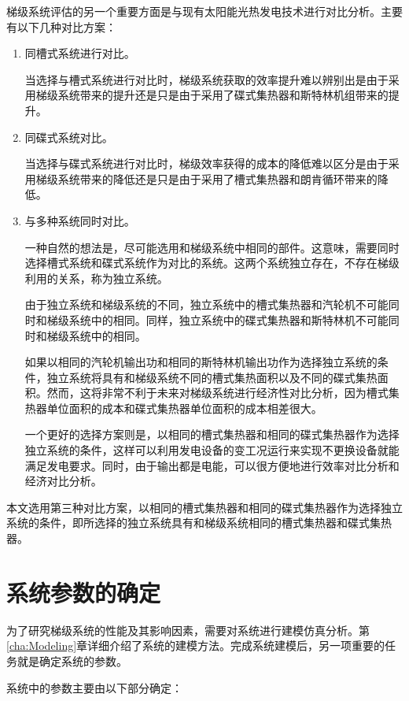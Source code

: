 梯级系统评估的另一个重要方面是与现有太阳能光热发电技术进行对比分析。主要有以下几种对比方案：

\begin{enumerate}[label=(\arabic*)]
	\item 同槽式系统进行对比。 

	\setlength\parindent{2em}当选择与槽式系统进行对比时，梯级系统获取的效率提升难以辨别出是由于采用梯级系统带来的提升还是只是由于采用了碟式集热器和斯特林机组带来的提升。
	\item 同碟式系统对比。
	
	当选择与碟式系统进行对比时，梯级效率获得的成本的降低难以区分是由于采用梯级系统带来的降低还是只是由于采用了槽式集热器和朗肯循环带来的降低。
	\item 与多种系统同时对比。
	
	一种自然的想法是，尽可能选用和梯级系统中相同的部件。这意味，需要同时选择槽式系统和碟式系统作为对比的系统。这两个系统独立存在，不存在梯级利用的关系，称为独立系统。
	
	由于独立系统和梯级系统的不同，独立系统中的槽式集热器和汽轮机不可能同时和梯级系统中的相同。同样，独立系统中的碟式集热器和斯特林机不可能同时和梯级系统中的相同。
	
	如果以相同的汽轮机输出功和相同的斯特林机输出功作为选择独立系统的条件，独立系统将具有和梯级系统不同的槽式集热面积以及不同的碟式集热面积。然而，这将非常不利于未来对梯级系统进行经济性对比分析，因为槽式集热器单位面积的成本和碟式集热器单位面积的成本相差很大。
	
	一个更好的选择方案则是，以相同的槽式集热器和相同的碟式集热器作为选择独立系统的条件，这样可以利用发电设备的变工况运行来实现不更换设备就能满足发电要求。同时，由于输出都是电能，可以很方便地进行效率对比分析和经济对比分析。
	
\end{enumerate}

本文选用第三种对比方案，以相同的槽式集热器和相同的碟式集热器作为选择独立系统的条件，即所选择的独立系统具有和梯级系统相同的槽式集热器和碟式集热器。

\section{系统参数的确定}

为了研究梯级系统的性能及其影响因素，需要对系统进行建模仿真分析。第\ref{cha:Modeling}章详细介绍了系统的建模方法。完成系统建模后，另一项重要的任务就是确定系统的参数。

系统中的参数主要由以下部分确定：


